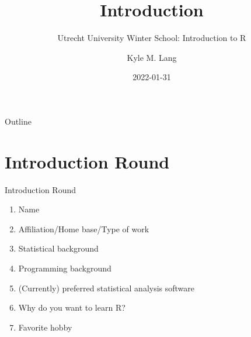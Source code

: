 \documentclass[10pt]{beamer}
\title{Introduction}
\subtitle{Utrecht University Winter School: Introduction to R}
\author{Kyle M. Lang}
\institute{Department of Methodology \& Statistics\\Utrecht University}
\date{2022-01-31}
\begin{document}
\begin{frame}[t, plain]
  \titlepage
\end{frame}


\begin{frame}{Outline}
  \tableofcontents
\end{frame}


\section{Introduction Round}


\begin{frame}{Introduction Round}
  
  \begin{enumerate}
  \item Name
  \item Affiliation/Home base/Type of work
  \item Statistical background
  \item Programming background
  \item (Currently) preferred statistical analysis software
  \item Why do you want to learn R?
  \item Favorite hobby
  \end{enumerate}
  
\end{frame}



\end{document}
